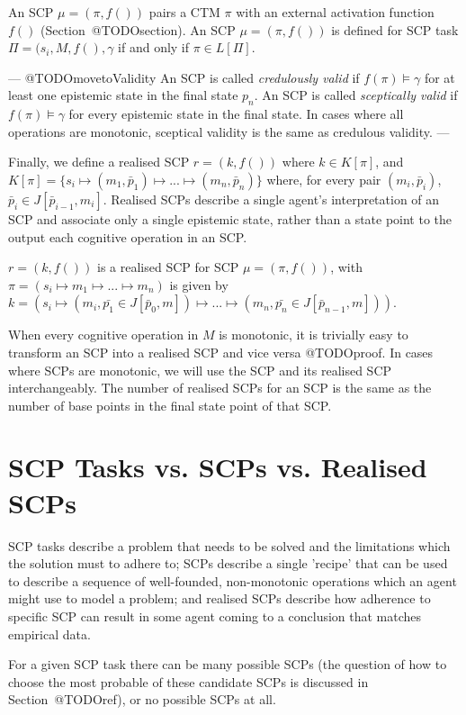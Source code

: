 An SCP $\mu=(\pi,f())$  pairs a CTM $\pi$ with an external activation function $f()$ (Section~@TODOsection). An SCP $\mu=(\pi,f())$ is defined for SCP task $\Pi=(s_i, M, f(), \gamma$ if and only if $\pi \in L[\Pi]$.

---
@TODOmovetoValidity
An SCP is called \textit{credulously valid} if $f(\pi) \models \gamma$ for at least one epistemic state in the final state $p_n$. An SCP is called \textit{sceptically valid} if $f(\pi) \models \gamma$ for every epistemic state in the final state. In cases where all operations are monotonic, sceptical validity is the same as credulous validity.
---

Finally, we define a realised SCP $r = (k, f())$ where $k \in K[\pi]$, and $K[\pi]=\{s_i \longmapsto (m_1,\bar{p}_1) \longmapsto ... \longmapsto (m_n,\bar{p}_n)\}$ where, for every pair $(m_i,\bar{p}_i)$, $\bar{p}_i \in J[\bar{p}_{i-1},m_i]$. Realised SCPs describe a single agent's interpretation of an SCP and associate only a single epistemic state, rather than a state point to the output each cognitive operation in an SCP. 

$r=(k, f())$ is a realised SCP for SCP $\mu=(\pi,f())$, with $\pi=(s_i\longmapsto m_1 \longmapsto ...\longmapsto m_n)$ is given by $k=(s_i \longmapsto (m_i, \bar{p_1} \in J[\bar{p}_{0},m]) \longmapsto ... \longmapsto (m_n, \bar{p_n} \in J[\bar{p}_{n-1},m]))$.

When every cognitive operation in $M$ is monotonic, it is trivially easy to transform an SCP into a realised SCP and vice versa @TODOproof. In cases where SCPs are monotonic, we will use the SCP and its realised SCP interchangeably. The number of realised SCPs for an SCP is the same as the number of base points in the final state point of that SCP.



\section{SCP Tasks vs. SCPs vs. Realised SCPs}

SCP tasks describe a problem that needs to be solved and the limitations which the solution must to adhere to; SCPs describe a single 'recipe' that can be used to describe a sequence of well-founded, non-monotonic operations which an agent might use to model a problem; and realised SCPs describe how adherence to specific SCP can result in some agent coming to a conclusion that matches empirical data.

For a given SCP task there can be many possible SCPs (the question of how to choose the most probable of these candidate SCPs is discussed in Section~@TODOref), or no possible SCPs at all.

